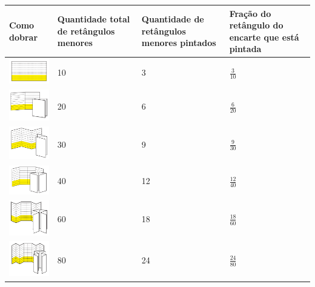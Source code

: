 \documentclass[10 pt,usenames,dvipsnames, oneside]{article}
\begin{document}
\ifdefined\prof
\clearpage
\begin{solucao}
\vspace{1em}

\begin{tabular}{|m{}|m{}|m{}|m{}|}
\hline
Como dobrar  & Quantidade total de retângulos menores &  Quantidade de retângulos menores pintados   &  Fração do retângulo do encarte que está pintada  \\
\hline 
\includegraphics[width=100pt,
keepaspectratio]{ativ2_fig01.png} & 10 & 3 &  
$\frac{3}{10}$ \\
\hline
\includegraphics[width=100pt,
keepaspectratio]{ativ2_fig02.png} &  20 & 6 & 
$\frac{6}{20}$ \\
\hline
\includegraphics[width=100pt,
keepaspectratio]{ativ2_fig03.png} &  30 & 9 & 
$\frac{9}{30}$ \\
\hline
\includegraphics[width=100pt,
keepaspectratio]{ativ2_fig04.png} &  40 & 12 & 
$\frac{12}{40}$ \\
\hline
\includegraphics[width=100pt, keepaspectratio]{ativ2_fig05.png}&  60 & 18 &   $\frac{18}{60}$ \\
\hline
\includegraphics[width=100pt, keepaspectratio]{ativ2_fig06.png}&  80 & 24 &  $\frac{24}{80}$ \\
\hline
\end{tabular}

\end{solucao}
\fi
\end{document}
